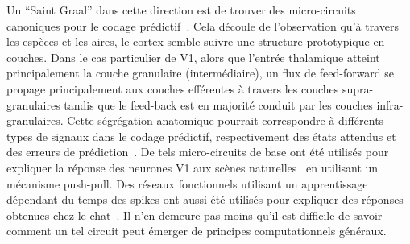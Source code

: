 Un ``Saint Graal'' dans cette direction est de trouver des micro-circuits
canoniques pour le codage prédictif~\citep{Bastos12}. Cela découle
de l'observation qu'à travers les espèces et les aires, le cortex semble
suivre une structure prototypique en couches. Dans le cas particulier de
V1, alors que l'entrée thalamique atteint principalement la couche
granulaire (intermédiaire), un flux de feed-forward se propage
principalement aux couches efférentes à travers les couches
supra-granulaires tandis que le feed-back est en majorité conduit  par les
couches infra-granulaires. Cette ségrégation anatomique pourrait
correspondre à différents types de signaux dans le codage prédictif,
respectivement des états attendus et des erreurs de prédiction~\citep{Bastos12}. De tels micro-circuits de base ont été utilisés pour
expliquer la réponse des neurones V1 aux scènes naturelles~\citep{Kremkow16} en utilisant un mécanisme push-pull. Des réseaux fonctionnels utilisant un apprentissage dépendant du temps des spikes ont aussi été utilisés pour expliquer des réponses obtenues chez le chat~\citep{Ladret19sfn}. Il n'en demeure pas moins
qu'il est difficile de savoir comment un tel circuit peut émerger de principes computationnels généraux.

